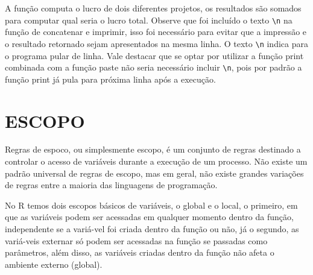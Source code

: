 \documentclass[
  11pt,
  a5paper,
  openany]{book}
\newenvironment{Shaded}{\begin{snugshade}}{\end{snugshade}}
\newcommand{\CharTok}[1]{\textcolor[rgb]{0.31,0.60,0.02}{#1}}
\newcommand{\CommentTok}[1]{\textcolor[rgb]{0.56,0.35,0.01}{\textit{#1}}}
\newcommand{\ControlFlowTok}[1]{\textcolor[rgb]{0.13,0.29,0.53}{\textbf{#1}}}
\newcommand{\DecValTok}[1]{\textcolor[rgb]{0.00,0.00,0.81}{#1}}
\newcommand{\KeywordTok}[1]{\textcolor[rgb]{0.13,0.29,0.53}{\textbf{#1}}}
\newcommand{\NormalTok}[1]{#1}
\newcommand{\OperatorTok}[1]{\textcolor[rgb]{0.81,0.36,0.00}{\textbf{#1}}}
\newcommand{\StringTok}[1]{\textcolor[rgb]{0.31,0.60,0.02}{#1}}
\begin{document}
\begin{Shaded}
\end{Shaded}

A função computa o lucro de dois diferentes projetos, os resultados são somados para computar qual seria o lucro total. Observe que foi incluído o texto \texttt{\textbackslash{}n} na função de concatenar e imprimir, isso foi necessário para evitar que a impressão e o resultado retornado sejam apresentados na mesma linha. O texto \texttt{\textbackslash{}n} indica para o programa pular de linha. Vale destacar que se optar por utilizar a função print combinada com a função paste não seria necessário incluir \texttt{\textbackslash{}n}, pois por padrão a função print já pula para próxima linha após a execução.

\hypertarget{escopo}{%
\section{ESCOPO}\label{escopo}}

Regras de espoco, ou simplesmente escopo, é um conjunto de regras destinado a controlar o acesso de variáveis durante a execução de um processo. Não existe um padrão universal de regras de escopo, mas em geral, não existe grandes variações de regras entre a maioria das linguagens de programação.

No R temos dois escopos básicos de variáveis, o global e o local, o primeiro, em que as variáveis podem ser acessadas em qualquer momento dentro da função, independente se a variá-vel foi criada dentro da função ou não, já o segundo, as variá-veis externar só podem ser acessadas na função se passadas como parâmetros, além disso, as variáveis criadas dentro da função não afeta o ambiente externo (global).

  
\end{document}
